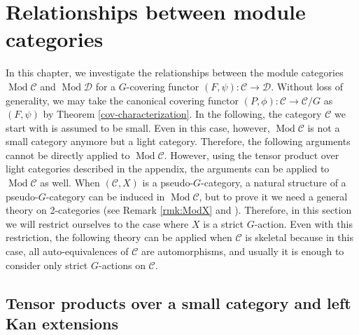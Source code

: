 \documentclass{surv-l}
\numberwithin{equation}{chapter}
\numberwithin{figure}{chapter}
\theoremstyle{plain}
\theoremstyle{definition}
\theoremstyle{remark}
\DeclareMathOperator{\Mod}{Mod}
\begin{document}
\chapter{Relationships between module categories}\label{ch:rel}\label{ch:7}
In this chapter, we investigate the relationships between the module categories
$\Mod {\mathcal{C}}$ and $\Mod {\mathcal{D}}$ for a $G$-covering functor $(F, \psi) \colon {\mathcal{C}} \to {\mathcal{D}}$.
Without loss of generality,
we may take the canonical covering functor
$(P, \phi) \colon {\mathcal{C}} \to {\mathcal{C}}/G$ as $(F, \psi)$
by Theorem \ref{cov-characterization}.
In the following, the category ${\mathcal{C}}$ we start with is assumed to be small.
Even in this case, however, $\Mod {\mathcal{C}}$ is not a small category anymore but a light category.
Therefore, the following arguments cannot be directly applied
to $\Mod {\mathcal{C}}$.
However, using the tensor product over light categories described in the appendix,
the arguments can be applied to $\Mod {\mathcal{C}}$ as well.
When $({\mathcal{C}}, X)$ is a pseudo-$G$-category,
a natural structure of a pseudo-$G$-category can be induced
in $\Mod {\mathcal{C}}$, but to prove it we need a general theory on 2-categories
(see Remark \ref{rmk:ModX} and \cite[Theorem 6.5, \S 9]{Asa-b}).
Therefore, in this section we will restrict ourselves to the case where $X$ is a strict $G$-action.
Even with this restriction, the following theory can be applied when ${\mathcal{C}}$ is skeletal
because in this case, all auto-equivalences of ${\mathcal{C}}$
are automorphisms, and usually it is enough to consider only strict $G$-actions on ${\mathcal{C}}$.

\section[Tensor products over a small category]{Tensor products over a small category and left Kan extensions}\label{sec:7.1}
\end{document}
